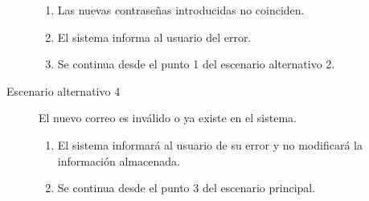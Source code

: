 \begin{description}
\begin{enumerate}
							\item Las nuevas contraseñas introducidas no coinciden.
							\item El sistema informa al usuario del error.
							\item Se continua desde el punto 1 del escenario alternativo 2.
							\end{enumerate}							
\item[Escenario alternativo 4] El nuevo correo es inválido o ya existe en el sistema.
							\begin{enumerate}
							\item El sistema informará al usuario de su error y no modificará la información almacenada.
							\item Se continua desde el punto 3 del escenario principal.
							\end{enumerate}							
\end{description}